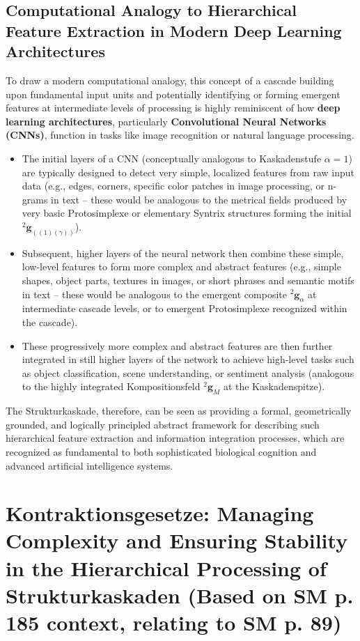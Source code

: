 \documentclass[
    12pt,              %
    a4paper,           %
    headings=normal,   %
    twoside=true,      %
    BCOR=8mm,          %
]{scrbook}
\newcommand{\kompositionsfeld}{{}^2\mathbf{g}}
\newcommand{\partialstruktur}[1]{{}^2\mathbf{g}_{(#1)}}
\newcommand{\kaskadenstufe}{\alpha}
\begin{document}
\subsection{Computational Analogy to Hierarchical Feature Extraction in Modern Deep Learning Architectures}
\label{sec:ch9_2_4_computational_analogy_deep_learning}
To draw a modern computational analogy, this concept of a cascade building upon fundamental input units and potentially identifying or forming emergent features at intermediate levels of processing is highly reminiscent of how \textbf{deep learning architectures}, particularly \textbf{Convolutional Neural Networks (CNNs)}, function in tasks like image recognition or natural language processing.
\begin{itemize}
    \item   The initial layers of a CNN (conceptually analogous to Kaskadenstufe \(\kaskadenstufe=1\)) are typically designed to detect very simple, localized features from raw input data (e.g., edges, corners, specific color patches in image processing, or n-grams in text – these would be analogous to the metrical fields produced by very basic Protosimplexe or elementary Syntrix structures forming the initial \(\partialstruktur{(1)(\gamma)}\)).
    \item   Subsequent, higher layers of the neural network then combine these simple, low-level features to form more complex and abstract features (e.g., simple shapes, object parts, textures in images, or short phrases and semantic motifs in text – these would be analogous to the emergent composite \(\kompositionsfeld_\alpha\) at intermediate cascade levels, or to emergent Protosimplexe recognized within the cascade).
    \item   These progressively more complex and abstract features are then further integrated in still higher layers of the network to achieve high-level tasks such as object classification, scene understanding, or sentiment analysis (analogous to the highly integrated Kompositionsfeld \(\kompositionsfeld_M\) at the Kaskadenspitze).
\end{itemize}
The Strukturkaskade, therefore, can be seen as providing a formal, geometrically grounded, and logically principled abstract framework for describing such hierarchical feature extraction and information integration processes, which are recognized as fundamental to both sophisticated biological cognition and advanced artificial intelligence systems.

\section{Kontraktionsgesetze: Managing Complexity and Ensuring Stability in the Hierarchical Processing of Strukturkaskaden (Based on SM p. 185 context, relating to SM p. 89)}
\label{sec:ch9_3_kontraktionsgesetze}
\end{document}
